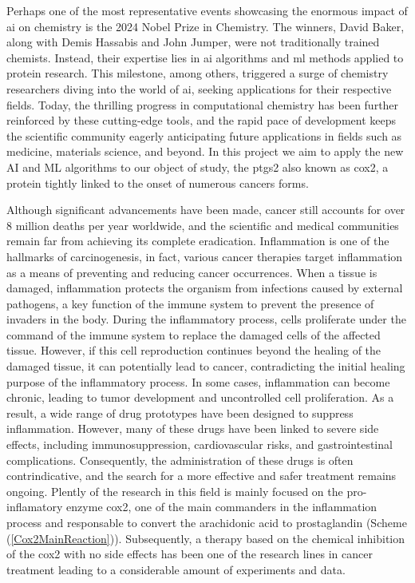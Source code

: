 \documentclass[11pt]{article}
\begin{document}
Perhaps one of the most representative events showcasing the enormous impact of \gls{ai} on chemistry is the 2024 Nobel Prize in Chemistry. The winners, David Baker\cite{NobelPrizeBale}, along with Demis Hassabis and John Jumper\cite{NobelPrizeJumper}, were not traditionally trained chemists. Instead, their expertise lies in \gls{ai} algorithms and \gls{ml} methods applied to protein research. This milestone, among others, triggered a surge of chemistry researchers diving into the world of \gls{ai}, seeking applications for their respective fields. Today, the thrilling progress in computational chemistry has been further reinforced by these cutting-edge tools\cite{MachineLearningPaper5Lipoxygenase}, and the rapid pace of development keeps the scientific community eagerly anticipating future applications in fields such as medicine, materials science, and beyond. In this project we aim to apply the new AI and ML algorithms to our object of study, the \gls{ptgs2} also known as \gls{cox2}, a protein tightly linked to the onset of numerous cancers forms\cite{Cox2CancerReview}. 

Although significant advancements have been made, cancer still accounts for over 8 million deaths per year worldwide, and the scientific and medical communities remain far from achieving its complete eradication. Inflammation is one of the hallmarks of carcinogenesis, in fact, various cancer therapies target inflammation as a means of preventing and reducing cancer occurrences. When a tissue is damaged, inflammation protects the organism from infections caused by external pathogens, a key function of the immune system to prevent the presence of invaders in the body. During the inflammatory process, cells proliferate under the command of the immune system to replace the damaged cells of the affected tissue. However, if this cell reproduction continues beyond the healing of the damaged tissue, it can potentially lead to cancer, contradicting the initial healing purpose of the inflammatory process. In some cases, inflammation can become chronic, leading to tumor development and uncontrolled cell proliferation. As a result, a wide range of drug prototypes have been designed to suppress inflammation. However, many of these drugs have been linked to severe side effects, including immunosuppression, cardiovascular risks, and gastrointestinal complications. Consequently, the administration of these drugs is often contrindicative, and the search for a more effective and safer treatment remains ongoing. Plently of the research in this field is mainly focused on the pro-inflamatory enzyme \gls{cox2}, one of the main commanders in the inflammation process and responsable to convert the arachidonic acid to prostaglandin  (Scheme (\ref{Cox2MainReaction})). Subsequently, a therapy based on the chemical inhibition of the \gls{cox2} with no side effects has been one of the research lines in cancer treatment leading to a considerable amount of experiments and data.
\end{document}
